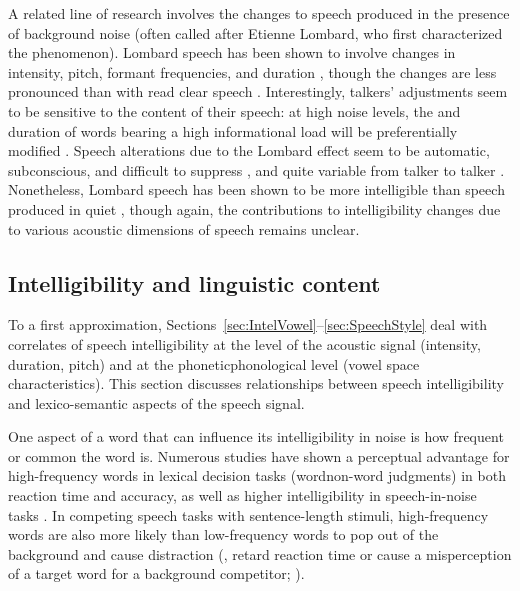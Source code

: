 A related line of research involves the changes to speech produced in the presence of background noise (often called  after Etienne Lombard, who first characterized the phenomenon).  Lombard speech has been shown to involve changes in intensity, pitch, formant frequencies, and duration \citep{LaneTranel1971, SummersEtAl1988}, though the changes are less pronounced than with read clear speech \citep{HazanBaker2011}.  Interestingly, talkers’ adjustments seem to be sensitive to the content of their speech: at high noise levels, the \fo{} and duration of words bearing a high informational load will be preferentially modified \citep{PatelSchell2008}.  Speech alterations due to the Lombard effect seem to be automatic, subconscious, and difficult to suppress \citep{PickEtAl1989}, and quite variable from talker to talker \citep{Junqua1993}.  Nonetheless, Lombard speech has been shown to be more intelligible than speech produced in quiet \citep{DreherONeill1957, SummersEtAl1988}, though again, the contributions to intelligibility changes due to various acoustic dimensions of speech remains unclear.


\subsection{Intelligibility and linguistic content}
To a first approximation, Sections~\ref{sec:IntelVowel}–\ref{sec:SpeechStyle} deal with correlates of speech intelligibility at the level of the acoustic signal (intensity, duration, pitch) and at the phonetic\slsh phonological level (vowel space characteristics).  This section discusses relationships between speech intelligibility and lexico-semantic aspects of the speech signal.

One aspect of a word that can influence its intelligibility in noise is how frequent or common the word is.  Numerous studies have shown a perceptual advantage for high-frequency words in lexical decision tasks (word\slsh non-word judgments) in both reaction time and accuracy, as well as higher intelligibility in speech-in-noise tasks \citep[\eg,][]{Howes1957, Savin1963, VitevitchLuce1998, DirksEtAl2001, TakayanagiEtAl2002, VitevitchRodriguez2005}.  In competing speech tasks with sentence-length stimuli, high-frequency words are also more likely than low-frequency words to pop out of the background and cause distraction (\ie, retard reaction time or cause a misperception of a target word for a background competitor; \citealt{BoulengerEtAl2010}).

